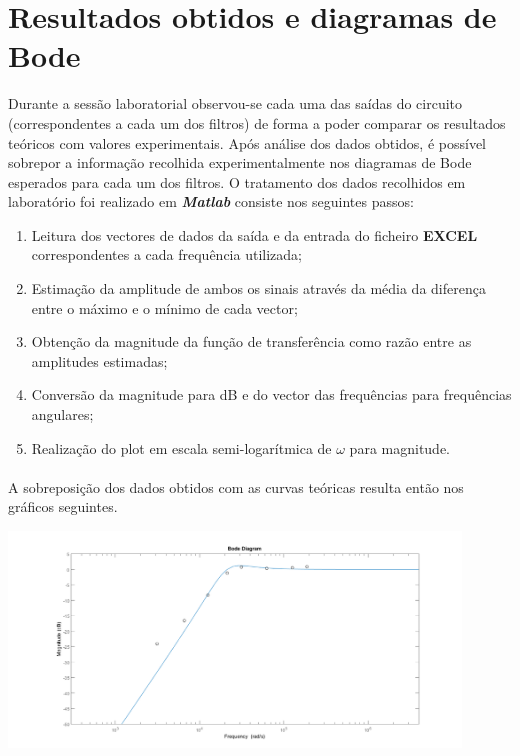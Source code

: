 \documentclass[a4paper,11pt]{report}
\begin{document}
\section{Resultados obtidos e diagramas de Bode}
Durante a sessão laboratorial observou-se cada uma das saídas do circuito (correspondentes a cada um dos filtros) de forma a poder comparar os resultados teóricos com valores experimentais. Após análise dos dados obtidos, é possível sobrepor a informação recolhida experimentalmente nos diagramas de Bode esperados para cada um dos filtros. O tratamento dos dados recolhidos em laboratório foi realizado em \textbf{\emph{Matlab}} consiste nos seguintes passos:
\begin{enumerate}
\item Leitura dos vectores de dados da saída e da entrada do ficheiro \textbf{EXCEL} correspondentes a cada frequência utilizada;
\item Estimação da amplitude de ambos os sinais através da média da diferença entre o máximo e o mínimo de cada vector;
\item Obtenção da magnitude da função de transferência como razão entre as amplitudes estimadas;
\item Conversão da magnitude para dB e do vector das frequências para frequências angulares;
\item Realização do plot em escala semi-logarítmica de $\omega$ para magnitude.
\end{enumerate}
\paragraph{}
A sobreposição dos dados obtidos com as curvas teóricas resulta então nos gráficos seguintes.
\begin{center}
     \includegraphics[angle=0,width=0.9\textwidth]{KHNT1exp.png}
     \label{fig:KHNT1exp}
     \end{center}
\end{document}
